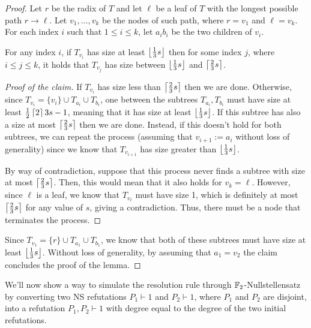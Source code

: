 \begin{proof}
    Let $r$ be the radix of $T$ and let $\ell$ be a leaf of $T$ with the longest possible path $r \to \ell$. Let $v_1, \ldots, v_k$ be the nodes of such path, where $r = v_1$ and $\ell = v_k$. For each index $i$ such that $1 \leq i \leq k$, let $a_i b_i$ be the two children of $v_i$.

    \begin{claim}
        For any index $i$, if $T_{v_i}$ has size at least $\left \lfloor \frac{1}{3} s \right \rfloor$ then for some index $j$, where $i \leq j \leq k$, it holds that $T_{v_j}$ has size between $\left \lfloor \frac{1}{3} s \right \rfloor$ and $\left \lceil \frac{2}{3} s \right \rceil$.
    \end{claim}

    \begin{proof}[Proof of the claim]
        If $T_{v_i}$ has size less than $\left \lceil \frac{2}{3} s \right \rceil$ then we are done. Otherwise, since $T_{v_i} = \{v_i\} \cup T_{a_i} \cup T_{b_i}$, one between the subtrees $T_{a_i}, T_{b_i}$ must have size at least $\frac{1}{2} \left \lceil 2 \right \rceil{3} s - 1$, meaning that it has size at least $\left \lfloor \frac{1}{3} s \right \rfloor$. If this subtree has also a size at most $\left \lceil \frac{2}{3} s \right \rceil$ then we are done. Instead, if this doesn't hold for both subtrees, we can repeat the process (assuming that $v_{i+1} := a_i$ without loss of generality) since we know that $T_{v_{i+1}}$ has size greater than $\left \lfloor \frac{1}{3} s \right \rfloor$.

        By way of contradiction, suppose that this process never finds a subtree with size at most $\left \lceil \frac{2}{3} s \right \rceil$. Then, this would mean that it also holds for $v_k = \ell$. However, since $\ell$ is a leaf, we know that $T_{v_\ell}$ must have size 1, which is definitely at most $\left \lceil \frac{2}{3} s \right \rceil$ for any value of $s$, giving a contradiction. Thus, there must be a node that terminates the process.
    \end{proof}
        
    Since $T_{v_1} = \{r\} \cup T_{a_1} \cup T_{b_1}$, we know that both of these subtrees must have size at least $\left \lfloor \frac{1}{3} s \right \rfloor$. Without loss of generality, by assuming that $a_1 = v_{2}$ the claim concludes the proof of the lemma.
\end{proof}

We'll now show a way to simulate the resolution rule through $\mathbb{F}_2$-Nullstellensatz by converting two \textsf{NS} refutations $P_1 \stackrel{}{\vdash} 1$ and $P_2 \stackrel{}{\vdash} 1$, where $P_1$ and $P_2$ are disjoint, into a refutation  $P_1, P_2 \stackrel{}{\vdash} 1$ with degree equal to the degree of the two initial refutations.

